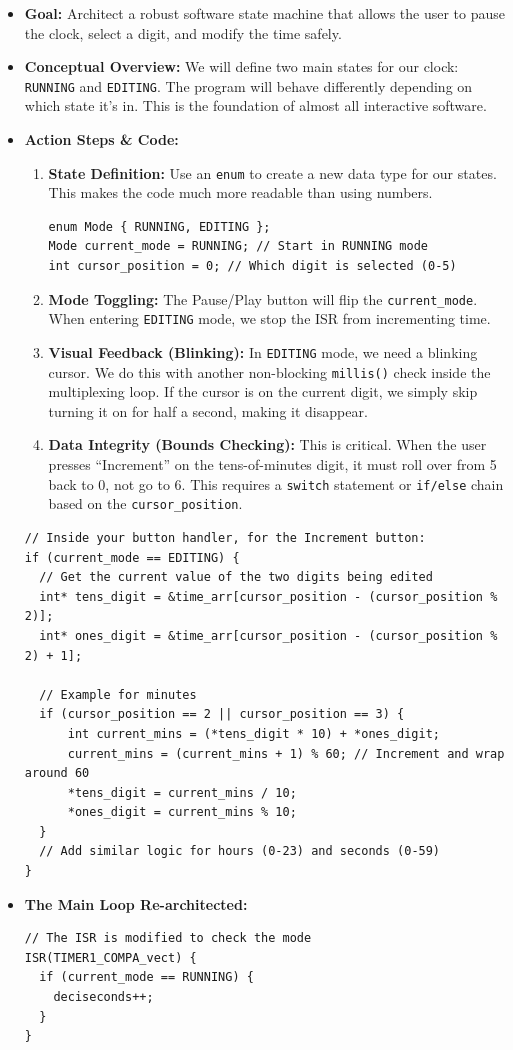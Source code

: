 \documentclass[11pt,a4paper]{article}
\begin{document}
\begin{itemize}
    \item \textbf{Goal:} Architect a robust software state machine that allows the user to pause the clock, select a digit, and modify the time safely.
    \item \textbf{Conceptual Overview:} We will define two main states for our clock: \verb|RUNNING| and \verb|EDITING|. The program will behave differently depending on which state it's in. This is the foundation of almost all interactive software.
    \item \textbf{Action Steps \& Code:}
    \begin{enumerate}
        \item \textbf{State Definition:} Use an \verb|enum| to create a new data type for our states. This makes the code much more readable than using numbers.
        \begin{lstlisting}
enum Mode { RUNNING, EDITING };
Mode current_mode = RUNNING; // Start in RUNNING mode
int cursor_position = 0; // Which digit is selected (0-5)
        \end{lstlisting}
        \item \textbf{Mode Toggling:} The Pause/Play button will flip the \verb|current_mode|. When entering \verb|EDITING| mode, we stop the ISR from incrementing time.
        \item \textbf{Visual Feedback (Blinking):} In \verb|EDITING| mode, we need a blinking cursor. We do this with another non-blocking \verb|millis()| check inside the multiplexing loop. If the cursor is on the current digit, we simply skip turning it on for half a second, making it disappear.
        \item \textbf{Data Integrity (Bounds Checking):} This is critical. When the user presses ``Increment'' on the tens-of-minutes digit, it must roll over from 5 back to 0, not go to 6. This requires a \verb|switch| statement or \verb|if/else| chain based on the \verb|cursor_position|.
    \end{enumerate}
\begin{lstlisting}[caption={Code for Module 4.3: Simplified Edit Logic}]
// Inside your button handler, for the Increment button:
if (current_mode == EDITING) {
  // Get the current value of the two digits being edited
  int* tens_digit = &time_arr[cursor_position - (cursor_position % 2)];
  int* ones_digit = &time_arr[cursor_position - (cursor_position % 2) + 1];
  
  // Example for minutes
  if (cursor_position == 2 || cursor_position == 3) {
      int current_mins = (*tens_digit * 10) + *ones_digit;
      current_mins = (current_mins + 1) % 60; // Increment and wrap around 60
      *tens_digit = current_mins / 10;
      *ones_digit = current_mins % 10;
  }
  // Add similar logic for hours (0-23) and seconds (0-59)
}
\end{lstlisting}
    \item \textbf{The Main Loop Re-architected:}
\begin{lstlisting}
// The ISR is modified to check the mode
ISR(TIMER1_COMPA_vect) {
  if (current_mode == RUNNING) {
    deciseconds++;
  }
}


\end{lstlisting}
\end{itemize}
\end{document}
